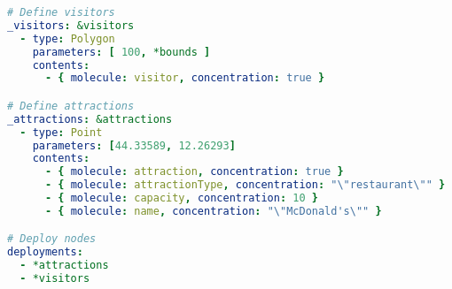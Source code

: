\begin{lstlisting}[language=yaml, label={lst:deployment}, caption=Deploying 1 attraction and 100 visitors inside the \texttt{bounds} polygon.]
# Define visitors
_visitors: &visitors
  - type: Polygon
    parameters: [ 100, *bounds ]
    contents:
      - { molecule: visitor, concentration: true }

# Define attractions
_attractions: &attractions
  - type: Point
    parameters: [44.33589, 12.26293]
    contents:
      - { molecule: attraction, concentration: true }
      - { molecule: attractionType, concentration: "\"restaurant\"" }
      - { molecule: capacity, concentration: 10 }
      - { molecule: name, concentration: "\"McDonald's\"" }

# Deploy nodes
deployments:
  - *attractions
  - *visitors
\end{lstlisting}
